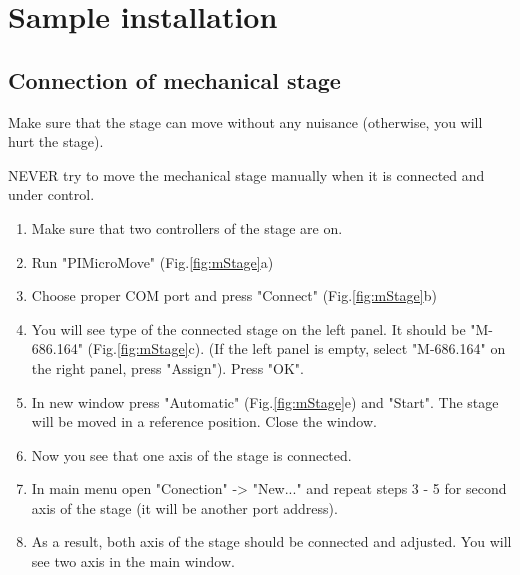 \documentclass[14pt,a4paper] {article}
\begin{document}
\section{Sample installation}

\subsection{Connection of mechanical stage}

Make sure that the stage can move without any nuisance (otherwise, you will hurt the stage).

NEVER try to move the mechanical stage manually when it is connected and under control.

\begin{enumerate}
\item Make sure that two controllers of the stage are on.
\item Run "PIMicroMove" (Fig.\ref{fig:mStage}a)
\item Choose proper COM port and press "Connect" (Fig.\ref{fig:mStage}b)
\item You will see type of the connected stage on the left panel. It should be "M-686.164" (Fig.\ref{fig:mStage}c). (If the left panel is empty, select "M-686.164" on the right panel, press "Assign"). Press "OK".
\item In new window press "Automatic" (Fig.\ref{fig:mStage}e) and  "Start". The stage will be moved in a reference position. Close the window.
\item Now you see that one axis of the stage is connected.
\item In main menu open "Conection" -> "New..." and repeat steps 3 - 5 for second axis of the stage (it will be another port address).
\item As a result, both axis of the stage should be connected and adjusted. You will see two axis in the main window.
\end{enumerate}
\end{document}
